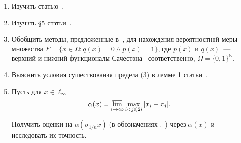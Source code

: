 \documentclass[a4paper,openbib]{report}
\renewcommand{\leq}{\leqslant}
\begin{document}


\begin{enumerate}
	\item
		Изучить статью~\cite{connor1990almost}.
	\item
		Изучить \S 5 статьи~\cite{Semenov2014geomprops}.
	\item
		Обобщить методы, предложенные в~\cite{connor1990almost},
		для нахождения вероятностной меры множества
		$F=\{x\in\Omega : q(x) = 0 \wedge p(x)= 1\}$,
		где $p(x)$ и $q(x)$~--- верхний и нижний функционалы Сачестона~\cite{sucheston1967banach} соответственно,
		$\Omega=\{0,1\}^\mathbb{N}$.
	\item
		Выяснить условия существования предела (3) в лемме 1 статьи~\cite{our-mz2019ac0}.
	\item
		Пусть для $x\in\ell_\infty$
		$$
			\alpha(x) = \varlimsup_{i\to\infty} \max_{i < j \leq 2i} |x_i-x_j|
			.
		$$

		Получить оценки на $\alpha(\sigma_{1/n} x)$
		(в обозначениях \cite{Semenov2010invariant},~\cite[p. 131, prop. 2.b.2]{lindenstrauss1979classical})
		через $\alpha(x)$ и исследовать их точность.
\end{enumerate}

\vspace{-3em}
\begingroup
	\let\clearpage\relax
	\printbibliography[title={\large Список литературы}]
\endgroup
\end{document}
